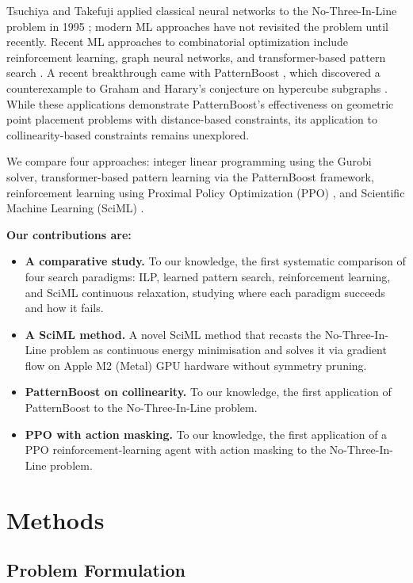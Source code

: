 \documentclass{article}
\theoremstyle{plain}
\theoremstyle{definition}
\theoremstyle{remark}
\begin{document}
Tsuchiya and Takefuji applied classical neural networks to the No-Three-In-Line problem in 1995 ; modern ML approaches have not revisited the problem until recently. Recent ML approaches to combinatorial optimization include reinforcement learning, graph neural networks, and transformer-based pattern search \cite{Mazyavkina2021,Cappart2023,Vaswani2017}. A recent breakthrough came with PatternBoost \cite{Charton2024}, which discovered a counterexample to Graham and Harary's conjecture on hypercube subgraphs \cite{GrahamHarary1992}. While these applications demonstrate PatternBoost's effectiveness on geometric point placement problems with distance-based constraints, its application to collinearity-based constraints remains unexplored.

We compare four approaches: integer linear programming using the Gurobi solver, transformer-based pattern learning via the PatternBoost framework, reinforcement learning using Proximal Policy Optimization (PPO) \cite{Schulman2017}, and Scientific Machine Learning (SciML) \cite{RackauckasNie2017,Karniadakis2021}.

\textbf{Our contributions are:}
\begin{itemize}
    \item \textbf{A comparative study.} To our knowledge, the first systematic comparison of four search paradigms: ILP, learned pattern search, reinforcement learning, and SciML continuous relaxation, studying where each paradigm succeeds and how it fails.
    \item \textbf{A SciML method.} A novel SciML method that recasts the No-Three-In-Line problem as continuous energy minimisation and solves it via gradient flow on Apple M2 (Metal) GPU hardware without symmetry pruning.
    \item \textbf{PatternBoost on collinearity.} To our knowledge, the first application of PatternBoost \cite{Charton2024} to the No-Three-In-Line problem.
    \item \textbf{PPO with action masking.} To our knowledge, the first application of a PPO reinforcement-learning agent \cite{Schulman2017} with action masking to the No-Three-In-Line problem.
\end{itemize}

\section{Methods}
\subsection{Problem Formulation}
\end{document}
